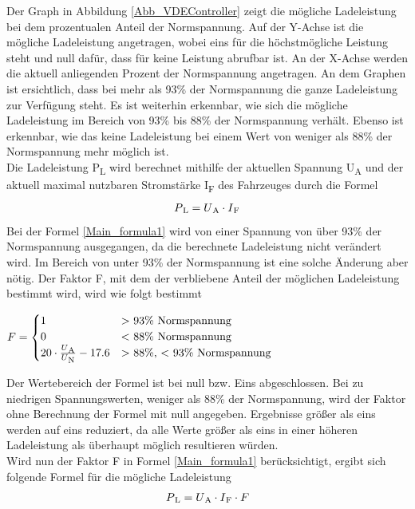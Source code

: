Der Graph in Abbildung \ref{Abb_VDEController} zeigt die mögliche Ladeleistung bei dem prozentualen Anteil der Normspannung. Auf der Y-Achse ist die mögliche Ladeleistung angetragen, wobei eins für die höchstmögliche Leistung steht und null dafür, dass für keine Leistung abrufbar ist. An der X-Achse werden die aktuell anliegenden Prozent der Normspannung angetragen. An dem Graphen ist ersichtlich, dass bei mehr als 93\% der Normspannung die ganze Ladeleistung zur Verfügung steht. Es ist weiterhin erkennbar, wie sich die mögliche Ladeleistung im Bereich von 93\% bis 88\% der Normspannung verhält. Ebenso ist erkennbar, wie das keine Ladeleistung bei einem Wert von weniger als 88\% der Normspannung mehr möglich ist. \\
Die Ladeleistung P\textsubscript{L} wird berechnet mithilfe der aktuellen Spannung U\textsubscript{A} und der aktuell maximal nutzbaren Stromstärke I\textsubscript{F} des Fahrzeuges durch die Formel
\begin{align}
	P\textsubscript{L} = U\textsubscript{A} \cdot I\textsubscript{F} \label{Main_formula1}
\end{align}
Bei der Formel \ref{Main_formula1} wird von einer Spannung von über 93\% der Normspannung ausgegangen, da die berechnete Ladeleistung nicht verändert wird. Im Bereich von unter 93\% der Normspannung ist eine solche Änderung aber nötig. Der Faktor F, mit dem der verbliebene Anteil der möglichen Ladeleistung bestimmt wird, wird wie folgt bestimmt \\
\begin{center}
	$ F = \begin{cases}
	1 &  \text{$>$ 93\% Normspannung} \\
	0 &  \text{$<$ 88\% Normspannung} \\
	20 \cdot \frac{U\textsubscript{A}}{U\textsubscript{N}} - 17.6 & \text{$>$ 88\%, $<$ 93\% Normspannung}
	\end{cases}
	$
\end{center}
Der Wertebereich der Formel ist bei null bzw. Eins abgeschlossen. Bei zu niedrigen Spannungswerten, weniger als 88\% der Normspannung, wird der Faktor ohne Berechnung der Formel mit null angegeben. Ergebnisse größer als eins werden auf eins reduziert, da alle Werte größer als eins in einer höheren Ladeleistung als überhaupt möglich resultieren würden. \\
Wird nun der Faktor F in Formel \ref{Main_formula1} berücksichtigt, ergibt sich folgende Formel für die mögliche Ladeleistung\\
\begin{align}
	P\textsubscript{L} = U\textsubscript{A} \cdot I\textsubscript{F} \cdot F \label{Main_formula3}
\end{align}
